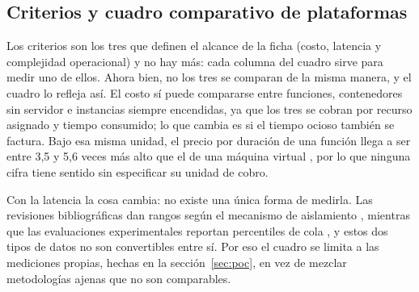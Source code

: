 \documentclass[12pt, letterpaper, table, xcdraw]{inf-pucv}
\begin{document}
\FloatBarrier

\subsection{Criterios y cuadro comparativo de plataformas}
\label{sec:cuadro}

Los criterios son los tres que definen el alcance de la ficha (costo, latencia y complejidad operacional) y no hay más: cada columna del cuadro sirve para medir uno de ellos. Ahora bien, no los tres se comparan de la misma manera, y el cuadro lo refleja así. El costo sí puede compararse entre funciones, contenedores sin servidor e instancias siempre encendidas, ya que los tres se cobran por recurso asignado y tiempo consumido; lo que cambia es si el tiempo ocioso también se factura. Bajo esa misma unidad, el precio por duración de una función llega a ser entre 3,5 y 5,6 veces más alto que el de una máquina virtual \parencite{liu2024demystifying}, por lo que ninguna cifra tiene sentido sin especificar su unidad de cobro.

Con la latencia la cosa cambia: no existe una única forma de medirla. Las revisiones bibliográficas dan rangos según el mecanismo de aislamiento \parencite{li2022serverless}, mientras que las evaluaciones experimentales reportan percentiles de cola \parencite{aslanpour2024faashouse}, y estos dos tipos de datos no son convertibles entre sí. Por eso el cuadro se limita a las mediciones propias, hechas en la sección~\ref{sec:poc}, en vez de mezclar metodologías ajenas que no son comparables.
\end{document}
